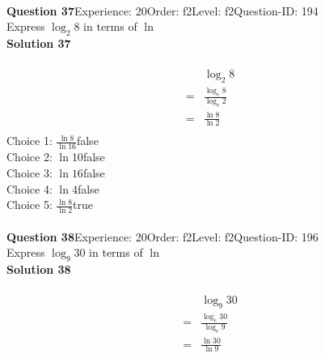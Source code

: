 \documentclass{article}
\begin{document}
\\[4pt]
\noindent\textbf{Question 37}\hspace{20pt}Experience: 20\hspace{20pt}Order: f2\hspace{20pt}Level: f2\hspace{20pt}Question-ID: 194\\[2pt]
Express $\log_{2}8$ in terms of $\ln$\\[4pt]
\noindent\textbf{Solution 37}\\[2pt]
\\[-35pt]\begin{align*}
&\log_{2}8\\[2pt]
=&\displaystyle\frac{\log_{e}8}{\log_{e}2}\\[2pt]
=&\displaystyle\frac{\ln8}{\ln2}\\[-100pt]
\end{align*}
Choice 1: \hspace{20pt}$\displaystyle\frac{\ln8}{\ln16}$\hspace{20pt}false\\
Choice 2: \hspace{20pt}$\ln{10}$\hspace{20pt}false\\
Choice 3: \hspace{20pt}$\ln{16}$\hspace{20pt}false\\
Choice 4: \hspace{20pt}$\ln{4}$\hspace{20pt}false\\
Choice 5: \hspace{20pt}$\displaystyle\frac{\ln8}{\ln2}$\hspace{20pt}true\\
\\[4pt]
\noindent\textbf{Question 38}\hspace{20pt}Experience: 20\hspace{20pt}Order: f2\hspace{20pt}Level: f2\hspace{20pt}Question-ID: 196\\[2pt]
Express $\log_{9}30$ in terms of $\ln$\\[4pt]
\noindent\textbf{Solution 38}\\[2pt]
\\[-35pt]\begin{align*}
&\log_{9}30\\[2pt]
=&\displaystyle\frac{\log_{e}30}{\log_{e}9}\\[2pt]
=&\displaystyle\frac{\ln30}{\ln9}\\[-100pt]
\end{align*}
\end{document}
